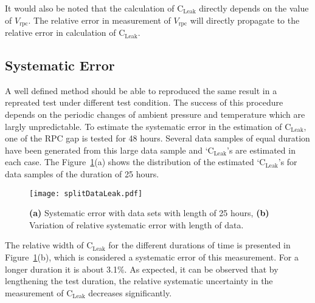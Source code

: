 It would also be noted that the calculation of $\textrm{C}_{\textrm{Leak}}$
directly depends on the value of $V_{\textrm{rpc}}$. The relative error in
measurement of $V_{\textrm{rpc}}$ will directly propagate to the relative
error in calculation of $\textrm{C}_{\textrm{Leak}}$.

\subsection{Systematic Error}
A well defined method should be able to reproduced the same result in a
repreated test under different test condition.
The success of this procedure depends on the periodic changes of
ambient pressure and temperature which are largly unpredictable.
To estimate the systematic error in the estimation of
$\textrm{C}_{\textrm{Leak}}$, one of the RPC gap is tested for 48 hours.
Several data samples of equal duration have been generated from this
large data sample and `$\textrm{C}_{\textrm{Leak}}$'s are estimated in
each case. The Figure~\ref{fig:systematic}(a) shows the distribution
of the estimated `$\textrm{C}_{\textrm{Leak}}$'s for data samples of the
duration of 25 hours.
\begin{figure}
  \centering
  \texttt{[image: splitDataLeak.pdf]}
  \caption{\textbf{(a)} Systematic error with data sets with length of
    25 hours, \textbf{(b)} Variation of relative systematic error with
    length of data.}
  \label{fig:systematic}
\end{figure}
The relative width of $\textrm{C}_{\text{Leak}}$ for the different
durations of time is presented in Figure~\ref{fig:systematic}(b),
which is considered a systematic error of this measurement. For a
longer duration it is about 3.1\%.
As expected, it can be observed that by lengthening the test duration,
the relative systematic uncertainty in the measurement of
$\textrm{C}_{\textrm{Leak}}$ decreases significantly.

